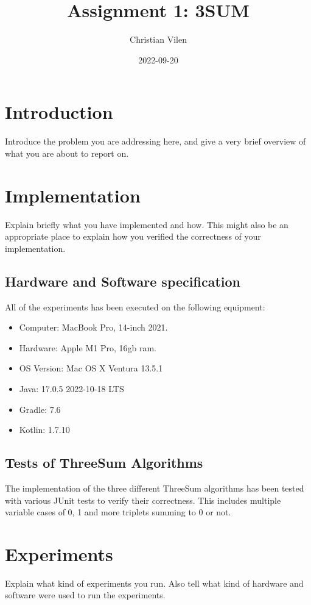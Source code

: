\documentclass[12pt, a4paper]{article}
\title{Assignment 1: 3SUM}
\author{Christian Vilen}
\date{2022-09-20}
\begin{document}
\maketitle

\section{Introduction}

Introduce the problem you are addressing here, and give a very brief
overview of what you are about to report on.

\section{Implementation}

Explain briefly what you have implemented and how. This might also be
an appropriate place to explain how you verified the correctness of
your implementation.

\subsection{Hardware and Software specification}
All of the experiments has been executed on the following equipment:
\begin{itemize}
\item Computer: MacBook Pro, 14-inch 2021.
\item Hardware: Apple M1 Pro, 16gb ram.
\item OS Version: Mac OS X Ventura 13.5.1
\item Java: 17.0.5 2022-10-18 LTS
\item Gradle: 7.6
\item Kotlin: 1.7.10
\end{itemize}

\subsection{Tests of ThreeSum Algorithms}
The implementation of the three different ThreeSum algorithms has been tested with various JUnit tests to verify their correctness. This includes multiple variable cases of 0, 1 and more triplets summing to 0 or not.

\section{Experiments}

Explain what kind of experiments you run. Also tell what kind of
hardware and software were used to run the experiments.
\end{document}
